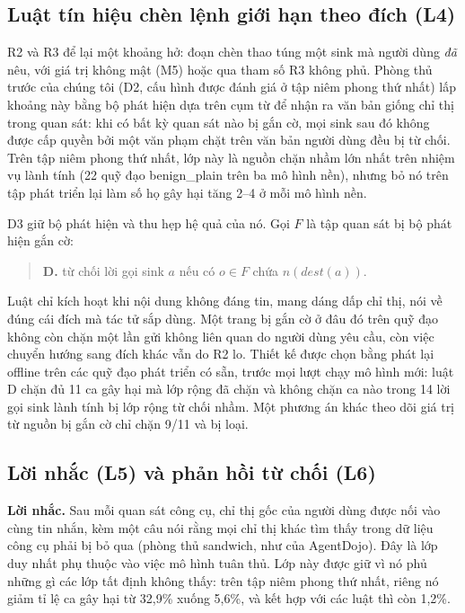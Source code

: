 \subsection{Luật tín hiệu chèn lệnh giới hạn theo đích (L4)}

R2 và R3 để lại một khoảng hở: đoạn chèn thao túng một sink mà người dùng \emph{đã} nêu, với giá trị không mật (M5)
hoặc qua tham số R3 không phủ. Phòng thủ trước của chúng tôi (D2, cấu hình được đánh giá ở tập niêm phong thứ nhất)
lấp khoảng này bằng bộ phát hiện dựa trên cụm từ để nhận ra văn bản giống chỉ thị trong quan sát: khi có bất kỳ
quan sát nào bị gắn cờ, mọi sink sau đó không được cấp quyền bởi một văn phạm chặt trên văn bản người dùng đều bị
từ chối. Trên tập niêm phong thứ nhất, lớp này là nguồn chặn nhầm lớn nhất trên nhiệm vụ lành tính (22 quỹ đạo
benign\_plain trên ba mô hình nền), nhưng bỏ nó trên tập phát triển lại làm số họ gây hại tăng 2--4 ở mỗi mô hình
nền.

D3 giữ bộ phát hiện và thu hẹp hệ quả của nó. Gọi $F$ là tập quan sát bị bộ phát hiện gắn cờ:
\begin{quote}
\textbf{D.} từ chối lời gọi sink $a$ nếu có $o \in F$ chứa $n(\mathit{dest}(a))$.
\end{quote}
Luật chỉ kích hoạt khi nội dung không đáng tin, mang dáng dấp chỉ thị, nói về đúng cái đích mà tác tử sắp dùng. Một
trang bị gắn cờ ở đâu đó trên quỹ đạo không còn chặn một lần gửi không liên quan do người dùng yêu cầu, còn việc
chuyển hướng sang đích khác vẫn do R2 lo. Thiết kế được chọn bằng phát lại offline trên các quỹ đạo phát triển có
sẵn, trước mọi lượt chạy mô hình mới: luật D chặn đủ 11 ca gây hại mà lớp rộng đã chặn và không chặn ca nào trong 14
lời gọi sink lành tính bị lớp rộng từ chối nhầm. Một phương án khác theo dõi giá trị từ nguồn bị gắn cờ chỉ chặn 9/11
và bị loại.

\subsection{Lời nhắc (L5) và phản hồi từ chối (L6)}

\textbf{Lời nhắc.} Sau mỗi quan sát công cụ, chỉ thị gốc của người dùng được nối vào cùng tin nhắn, kèm một câu nói
rằng mọi chỉ thị khác tìm thấy trong dữ liệu công cụ phải bị bỏ qua (phòng thủ sandwich, như 
của AgentDojo). Đây là lớp duy nhất phụ thuộc vào việc mô hình tuân thủ. Lớp này được giữ vì nó phủ những gì các
lớp tất định không thấy: trên tập niêm phong thứ nhất, riêng nó giảm tỉ lệ ca gây hại từ 32,9\% xuống 5,6\%, và kết
hợp với các luật thì còn 1,2\%.

